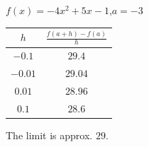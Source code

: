 {$\displaystyle f(x) = -4x^2+5x-1$,\quad  $a=-3$}
{\begin{tabular}{cc}
$h$ & $\frac{f(a+h)-f(a)}{h}$\\ \hline 
 $-0.1$ & $29.4$ \\
 $-0.01$ & $29.04$ \\
 $0.01$ & $28.96$ \\
 $0.1$ & $28.6$
\end{tabular}

The limit is approx. $29$.
}
